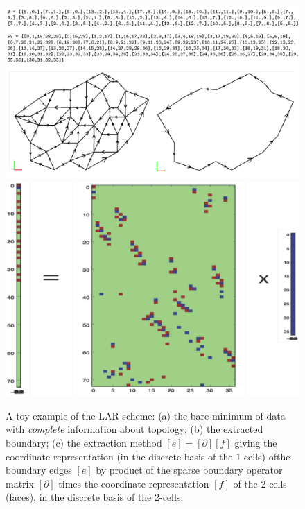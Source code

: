 \begin{figure}[!htbp] %
 \centering
 \includegraphics[width=0.5\linewidth]{images/minimum-colors-test} 
 \hfill
 \includegraphics[width=0.4\linewidth]{images/boundary} 
 \caption{A toy example of the LAR scheme: (a) the bare minimum of data with \emph{complete} information about topology; (b) the extracted boundary; (c) the extraction method $[e] = [\partial][f]$ giving the coordinate representation (in the discrete basis of the 1-cells) ofthe boundary edges $[e]$ by product of the sparse boundary operator matrix $[\partial]$ times the coordinate representation $[f]$ of the 2-cells (faces), in the discrete basis of the 2-cells.}
 \label{fig:minimum}
\end{figure}


 
